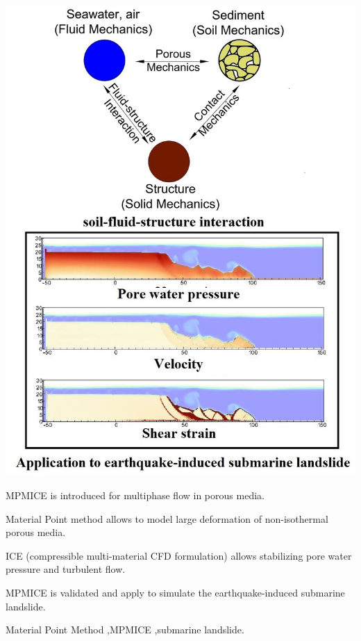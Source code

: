 \documentclass[preprint,12pt]{elsarticle}
\begin{document}
\begin{frontmatter}
\begin{abstract}
\end {abstract}
\begin{graphicalabstract}
%
%
\center
\includegraphics[scale=0.45]{abstract.jpg}
%
%
\end {graphicalabstract}

\begin{highlights}
\item MPMICE is introduced for multiphase flow in porous media.
\item Material Point method allows to model large deformation of non-isothermal porous media.
\item ICE (compressible multi-material CFD formulation) allows stabilizing pore water pressure and turbulent flow.
\item MPMICE is validated and apply to simulate the earthquake-induced submarine landslide.
\end {highlights}

\begin{keyword}


Material Point Method 
\sep MPMICE
\sep submarine landslide.
\end {keyword}
\end {frontmatter}
\end{document}
